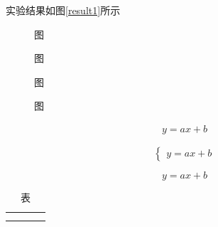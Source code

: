 \documentclass[UTF8]{ctexart}  %
\begin{document}
实验结果如图\ref{result1}所示

\begin{figure}[H]
    \centering
    \begin{minipage}[t]{0.3\textwidth}
        \centering
        \caption{图}
        \label{result1}
    \end{minipage}
    \begin{minipage}[t]{0.3\textwidth}
        \centering
        \caption{图}
        \label{2}
    \end{minipage}
    \begin{minipage}[t]{0.3\textwidth}
        \centering
        \caption{图}
        \label{3}
    \end{minipage}
\end{figure}


\begin{figure}[H]
    \centering
    \caption{图}
    \label{4}
\end{figure}

\begin{equation}
    \begin{aligned}
        y=ax+b
    \end{aligned}
    \label{eq1}
\end{equation}

\begin{equation}
    \begin{cases}
        y=ax+b
    \end{cases}
    \label{eq2}
\end{equation}

$$y=ax+b$$

\begin{table}[H]    
    \begin{spacing}{1.4}  %
        \centering
        \caption{表}
        \begin{tabular}{c|c|c|c}
            \toprule \\
            \midrule \\
            \hline \\  %
            \bottomrule
        \end{tabular}
        \label{5}
    \end{spacing}
\end{table}
\end{document}
